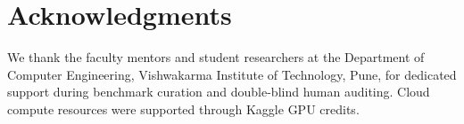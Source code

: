 \documentclass[conference]{IEEEtran}
\begin{document}
\section*{Acknowledgments}
We thank the faculty mentors and student researchers at the Department of Computer Engineering, Vishwakarma Institute of Technology, Pune, for dedicated support during benchmark curation and double-blind human auditing. Cloud compute resources were supported through Kaggle GPU credits.



\end{document}
